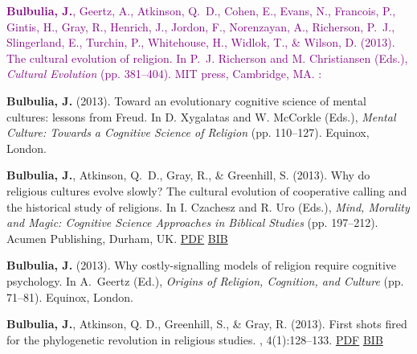 \documentclass{article}
\begin{document}
\begin{thebibliography}{99}
\textcolor{Purple}{{\bf Bulbulia, J.}, Geertz, A., Atkinson, Q.~D., Cohen, E., Evans, N., Francois, P.,								
  Gintis, H., Gray, R., Henrich, J., Jordon, F., Norenzayan, A., Richerson,																
  P.~J., Slingerland, E., Turchin, P., Whitehouse, H., Widlok, T., \& Wilson,														
  D. (2013).
\newblock The cultural evolution of religion.
\newblock In P.~J. Richerson and M. Christiansen (Eds.), {\em Cultural
  Evolution} (pp. 381--404). MIT press, Cambridge, MA. : }\newblock %


{\bf Bulbulia, J.} (2013).
\newblock Toward an evolutionary cognitive science of mental cultures: lessons
  from {F}reud.
\newblock In D. Xygalatas and W. McCorkle (Eds.), {\em Mental Culture:
  Towards a Cognitive Science of Religion} (pp. 110--127). Equinox,
  London.  
  \newblock  %

 
{\bf Bulbulia, J.}, Atkinson, Q.~D., Gray, R., \& Greenhill, S. (2013).
\newblock Why do religious cultures evolve slowly? The cultural evolution of cooperative calling and the historical study of religions. In I. Czachesz and R. Uro (Eds.), {\em Mind, Morality and Magic: Cognitive Science Approaches in Biblical Studies} (pp. 197--212).
\newblock Acumen Publishing, Durham, UK.
\href{https://www.dropbox.com/s/jcf4k7e7mex62ax/2013.BulEtAl.why_rel_evo_slow.pdf?dl=0}{PDF} \href{https://www.dropbox.com/s/vva6osofhrjsd5r/2014.BulEtAl_WhyRelCultSlow.bib?dl=0}{BIB}


{\bf Bulbulia, J.} (2013).
\newblock Why costly-signalling models of religion require cognitive
  psychology.
\newblock In A.~Geertz (Ed.), {\em Origins of Religion, Cognition, and
  Culture} (pp. 71--81). Equinox, London. %


{\bf Bulbulia, J.}, Atkinson, Q. D., Greenhill, S., \& Gray, R. (2013).
\newblock First shots fired for the phylogenetic revolution in religious
  studies.
, 4(1):128--133.
\href{http://escholarship.org/uc/item/05n4z9w8#page-27}{PDF} \href{https://www.dropbox.com/s/hyj3r479lot4u54/2013.Bulbulia.First.Shots..bib?dl=0}{BIB}



\end{thebibliography}
\end{document}
